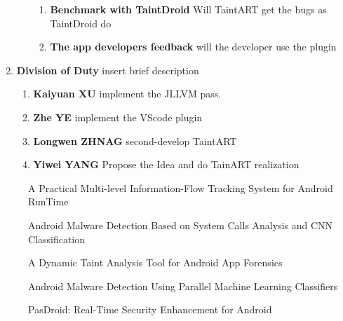 \documentclass[
    ngerman,american
    ]{scrartcl}
\newcommand{\lang}{en}
\begin{document}
\begin{enumerate}
\begin{enumerate}
\begin{enumerate}
                            \item \textbf{Benchmark with TaintDroid} Will TaintART get the bugs as TaintDroid do
                            \item \textbf{The app developers feedback} will the developer use the plugin 
                        \end{enumerate}
                    \end{enumerate}
            \item \textbf{Division of Duty} insert brief description
                    \begin{enumerate}
                        \item \textbf{Kaiyuan XU} implement the JLLVM pass.
                        \item \textbf{Zhe YE} implement the VScode plugin
                        \item \textbf{Longwen ZHNAG} second-develop TaintART
                        \item \textbf{Yiwei YANG} Propose the Idea and do TainART realization
                    \end{enumerate}
        \end{enumerate}
    
      
        \sectionSource{\lang}
        \sectionSourceDescription{\lang}

        \begin{description}
        \item[\cite{Sun:2016:TPM:2976749.2978343}] A Practical Multi-level Information-Flow Tracking System for Android RunTime
        \item[\cite{WCNCW.2019.8902627}] Android Malware Detection Based on System Calls Analysis and CNN Classification
        \item[\cite{SPW.2018.00031}] A Dynamic Taint Analysis Tool for Android App Forensics
        \item[\cite{NGMAST.2014.23}] Android Malware Detection Using Parallel Machine Learning Classifiers
        \item[\cite{IMIS.2014.28}] PasDroid: Real-Time Security Enhancement for Android
        \end{description}
        
        
    
\end{document}
